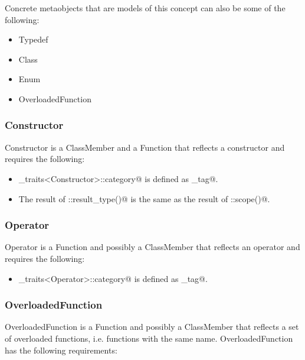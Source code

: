 Concrete metaobjects that are models of this concept can also be some of the following:
\begin{itemize}
	\item{\metaobject Typedef}
	\item{\metaobject Class}
	\item{\metaobject Enum}
	\item{\metaobject OverloadedFunction}
\end{itemize}

\subsubsection{Constructor}

{\metaobject Constructor} is a {\metaobject ClassMember} and a {\metaobject Function} that
reflects a constructor and requires the following:

\begin{itemize}
	\item \verb@metaobject_traits<Constructor>::category@ is defined as  \verb@constructor_tag@.

	\item The result of \verb@Constructor::result_type()@ is the same as the result of
	\verb@Constructor::scope()@.
\end{itemize}

\subsubsection{Operator}

{\metaobject Operator} is a {\metaobject Function} and possibly a {\metaobject ClassMember}
that reflects an operator and requires the following:

\begin{itemize}
	\item \verb@metaobject_traits<Operator>::category@ is defined as  \verb@operator_tag@.
\end{itemize}

\subsubsection{OverloadedFunction}

{\metaobject OverloadedFunction} is a {\metaobject Function} and possibly a {\metaobject ClassMember}
that reflects a set of overloaded functions, i.e. functions with the same name.
{\metaobject OverloadedFunction} has the following requirements:

